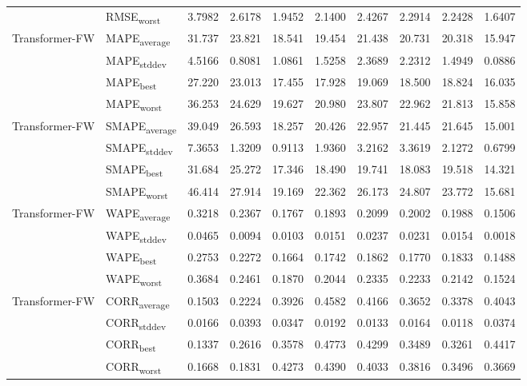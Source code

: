 {\begin{longtable}{l l c c c c c c c c}
 & RMSE\textsubscript{worst} & 3.7982 & 2.6178 & 1.9452 & 2.1400 & 2.4267 & 2.2914 & 2.2428 & 1.6407 \\
\cmidrule(lr){2-10}
\multirow{4}{*}{Transformer-FW} & MAPE\textsubscript{average} & 31.737 & 23.821 & 18.541 & 19.454 & 21.438 & 20.731 & 20.318 & 15.947 \\
 & MAPE\textsubscript{stddev} & 4.5166 & 0.8081 & 1.0861 & 1.5258 & 2.3689 & 2.2312 & 1.4949 & 0.0886 \\
 & MAPE\textsubscript{best} & 27.220 & 23.013 & 17.455 & 17.928 & 19.069 & 18.500 & 18.824 & 16.035 \\
 & MAPE\textsubscript{worst} & 36.253 & 24.629 & 19.627 & 20.980 & 23.807 & 22.962 & 21.813 & 15.858 \\
\cmidrule(lr){2-10}
\multirow{4}{*}{Transformer-FW} & SMAPE\textsubscript{average} & 39.049 & 26.593 & 18.257 & 20.426 & 22.957 & 21.445 & 21.645 & 15.001 \\
 & SMAPE\textsubscript{stddev} & 7.3653 & 1.3209 & 0.9113 & 1.9360 & 3.2162 & 3.3619 & 2.1272 & 0.6799 \\
 & SMAPE\textsubscript{best} & 31.684 & 25.272 & 17.346 & 18.490 & 19.741 & 18.083 & 19.518 & 14.321 \\
 & SMAPE\textsubscript{worst} & 46.414 & 27.914 & 19.169 & 22.362 & 26.173 & 24.807 & 23.772 & 15.681 \\
\cmidrule(lr){2-10}
\multirow{4}{*}{Transformer-FW} & WAPE\textsubscript{average} & 0.3218 & 0.2367 & 0.1767 & 0.1893 & 0.2099 & 0.2002 & 0.1988 & 0.1506 \\
 & WAPE\textsubscript{stddev} & 0.0465 & 0.0094 & 0.0103 & 0.0151 & 0.0237 & 0.0231 & 0.0154 & 0.0018 \\
 & WAPE\textsubscript{best} & 0.2753 & 0.2272 & 0.1664 & 0.1742 & 0.1862 & 0.1770 & 0.1833 & 0.1488 \\
 & WAPE\textsubscript{worst} & 0.3684 & 0.2461 & 0.1870 & 0.2044 & 0.2335 & 0.2233 & 0.2142 & 0.1524 \\
\cmidrule(lr){2-10}
\multirow{4}{*}{Transformer-FW} & CORR\textsubscript{average} & 0.1503 & 0.2224 & 0.3926 & 0.4582 & 0.4166 & 0.3652 & 0.3378 & 0.4043 \\
 & CORR\textsubscript{stddev} & 0.0166 & 0.0393 & 0.0347 & 0.0192 & 0.0133 & 0.0164 & 0.0118 & 0.0374 \\
 & CORR\textsubscript{best} & 0.1337 & 0.2616 & 0.3578 & 0.4773 & 0.4299 & 0.3489 & 0.3261 & 0.4417 \\
 & CORR\textsubscript{worst} & 0.1668 & 0.1831 & 0.4273 & 0.4390 & 0.4033 & 0.3816 & 0.3496 & 0.3669 \\

\end{longtable}}
